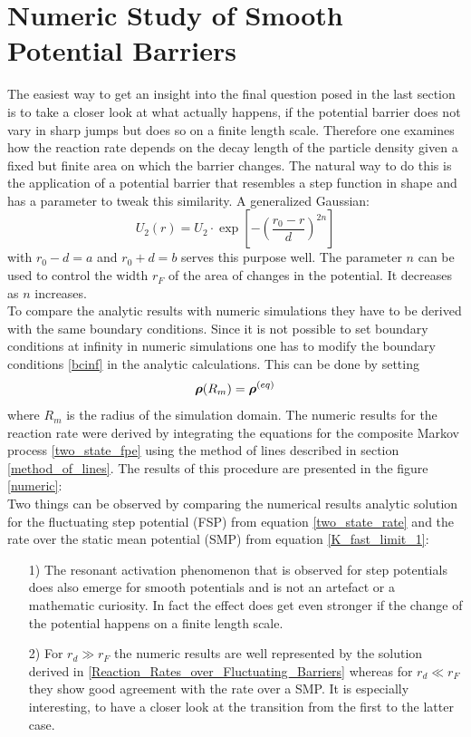 \section{Numeric Study of Smooth Potential Barriers}
\label{Numeric_Study}
The easiest way to get an insight into the final question posed in the last section is to take a closer look at what actually happens, if the potential barrier does not vary in sharp jumps but does so on a finite length scale.
Therefore one examines how the reaction rate depends on the decay length of the particle density given a fixed but finite area on which the barrier changes. The natural way to do this is the application of a potential barrier that resembles a step function in shape and has a parameter to tweak this similarity. A generalized Gaussian:
\begin{equation}
    U_2(r) = U_2 \cdot \exp \left[ - \left( \frac{r_0 - r}{d} \right)^{2n} \right]
    \label{generalized_gaussian}
\end{equation}
with $r_0-d=a$ and $r_0+d=b$ serves this purpose well. The parameter $n$ can be used to control the width $r_F$ of the area of changes in the potential. It decreases as $n$ increases. \\
To compare the analytic results with numeric simulations they have to be derived with the same boundary conditions. Since it is not possible to set boundary conditions at infinity in numeric simulations one has to modify the boundary conditions \eqref{bcinf} in the analytic calculations. This can be done by setting 
\begin{equation}
    \boldsymbol{\mathbf{\rho}}(R_m) = \boldsymbol{\mathbf{\rho}}^{(eq)}
    \label{BC_for_numerics}
\end{equation}
where $R_m$ is the radius of the simulation domain. The numeric results for the reaction rate were derived by integrating the equations for the composite Markov process \eqref{two_state_fpe} using the method of lines described in section \ref{method_of_lines}. The results of this procedure are presented in the figure \ref{numeric}: \vspace{-0.5 cm}\\

Two things can be observed by comparing the numerical results analytic solution for the fluctuating step potential (FSP) from equation \eqref{two_state_rate} and the rate over the static mean potential (SMP) from equation \eqref{K_fast_limit_1}: 
\begin{itemize}
    \item[1)]The resonant activation phenomenon that is observed for step potentials does also emerge for smooth potentials and is not an artefact or a mathematic curiosity. In fact the effect does get even stronger if the change of the potential happens on a finite length scale.
    \item[2)] For $r_d \gg r_F$ the numeric results are well represented by the solution derived in \ref{Reaction_Rates_over_Fluctuating_Barriers} whereas for $r_d \ll r_F$ they show good agreement with the rate over a SMP. It is especially interesting, to have a closer look at the transition from the first to the latter case.
\end{itemize}

